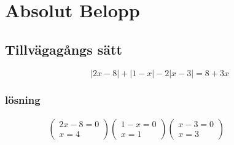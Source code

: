 

\newpage
\section{Absolut Belopp}
\subsection{Tillvägagångs sätt}
\begin{equation}
| 2 x - 8 | + | 1 - x | - 2 | x - 3 | = 8 + 3 x
\end{equation}


\subsubsection{lösning}
\begin{align*}
\left( \begin{array} { c } { 2 x - 8 = 0 } \\ { x = 4 } \end{array} \right)
\left( \begin{array} { c } { 1 - x = 0 } \\ { x = 1 } \end{array} \right)
\left( \begin{array} { c } { x - 3 = 0 } \\ { x = 3 } \end{array} \right)
&\quad
&\quad
&\quad
\end{align*}

